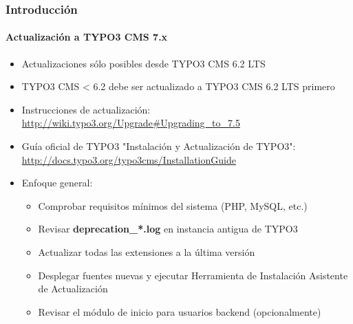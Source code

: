 \begin{frame}[fragile]
	\frametitle{Introducción}
	\framesubtitle{Actualización a TYPO3 CMS 7.x}

	\begin{itemize}
		\item Actualizaciones sólo posibles desde TYPO3 CMS 6.2 LTS
		\item TYPO3 CMS < 6.2 debe ser actualizado a TYPO3 CMS 6.2 LTS primero
	\end{itemize}

	\begin{itemize}

		\item Instrucciones de actualización:\newline
			\smaller\url{http://wiki.typo3.org/Upgrade#Upgrading_to_7.5}\normalsize
		\item Guía oficial de TYPO3 "Instalación y Actualización de TYPO3":
			\smaller\url{http://docs.typo3.org/typo3cms/InstallationGuide}\normalsize
		\item Enfoque general:
			\begin{itemize}
				\item Comprobar requisitos mínimos del sistema \small(PHP, MySQL, etc.)
				\item Revisar \textbf{deprecation\_*.log} en instancia antigua de TYPO3
				\item Actualizar todas las extensiones a la última versión
				\item Desplegar fuentes nuevas y ejecutar Herramienta de Instalación \textrightarrow Asistente de Actualización
				\item Revisar el módulo de inicio para usuarios backend (opcionalmente)
			\end{itemize}
	\end{itemize}

\end{frame}

